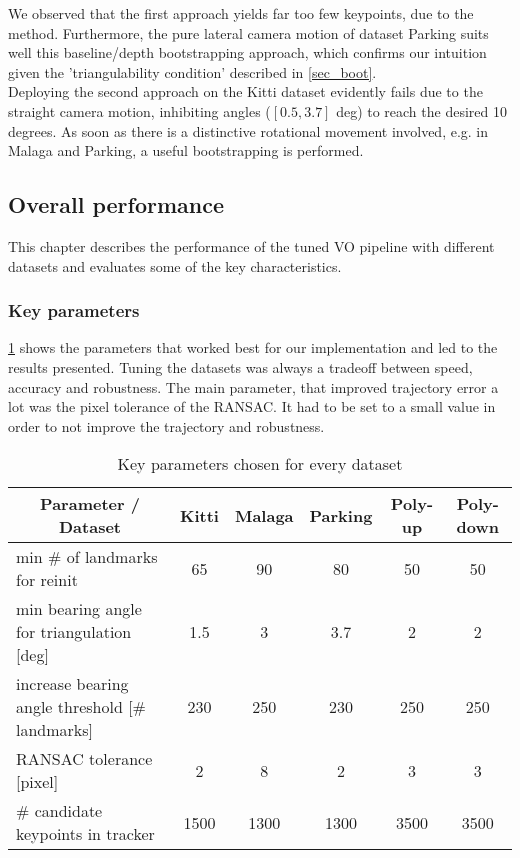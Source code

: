 We observed that the first approach yields far too few keypoints, due to the  method. Furthermore, the pure lateral camera motion of dataset Parking suits well this baseline/depth bootstrapping approach, which confirms our intuition given the 'triangulability condition' described in \cref{sec_boot}.\\

Deploying the second approach on the Kitti dataset evidently fails due to the straight camera motion, inhibiting angles ($[0.5, 3.7]$ deg) to reach the desired 10 degrees. As soon as there is a distinctive rotational movement involved, e.g. in Malaga and Parking, a useful bootstrapping is performed.


\subsection{Overall performance}
This chapter describes the performance of the tuned VO pipeline with different datasets and evaluates some of the key characteristics.

\subsubsection{Key parameters}
\label{sec_key_params}
\cref{params_table} shows the parameters that worked best for our implementation and led to the results presented. Tuning the datasets was always a tradeoff between speed, accuracy and robustness. The main parameter, that improved trajectory error a lot was the pixel tolerance of the RANSAC. It had to be set to a small value in order to not improve the trajectory and robustness.
\begin{table}[!h]
	\centering
	\begin{tabular}{|l|c|c|c|c|c|}
	\hline
	\multicolumn{1}{|c|}{\textbf{Parameter / Dataset}} & \textbf{Kitti} & \textbf{Malaga} & \textbf{Parking} & \textbf{Poly-up} & \textbf{Poly-down} \\ \hline
	min \# of landmarks for reinit                     & 65             &  90               & 80               & 50               & 50\\ \hline
	min bearing angle for triangulation {[}deg{]}      & 1.5            &  3         & 3.7              & 2                &
2\\ \hline
	increase bearing angle threshold {[}\# landmarks{]}& 230            &  250               & 230              & 250              & 250\\ \hline
	RANSAC tolerance {[}pixel{]}                       & 2              & 8                & 2                & 3                &
3\\ \hline
	\# candidate keypoints in tracker                  & 1500           &   1300              & 1300             & 3500             & 3500\\ \hline
	\end{tabular}
	\caption{Key parameters chosen for every dataset}
	\label{params_table}
\end{table}
	
